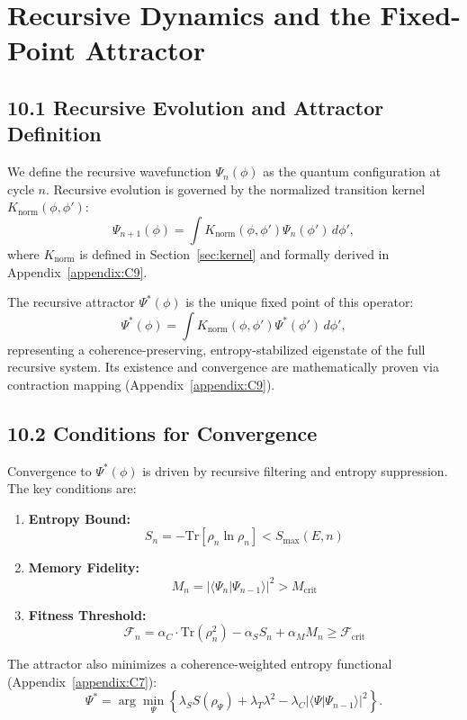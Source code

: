 \section{Recursive Dynamics and the Fixed-Point Attractor}
\label{sec:attractor}

\subsection{10.1 Recursive Evolution and Attractor Definition}

We define the recursive wavefunction \( \Psi_n(\phi) \) as the quantum configuration at cycle \( n \). Recursive evolution is governed by the normalized transition kernel \( K_{\text{norm}}(\phi, \phi') \):
\[
\Psi_{n+1}(\phi) = \int K_{\text{norm}}(\phi, \phi') \Psi_n(\phi') \, d\phi',
\]
where \( K_{\text{norm}} \) is defined in Section~\ref{sec:kernel} and formally derived in Appendix~\ref{appendix:C9}.

The recursive attractor \( \Psi^*(\phi) \) is the unique fixed point of this operator:
\[
\Psi^*(\phi) = \int K_{\text{norm}}(\phi, \phi') \Psi^*(\phi') \, d\phi',
\]
representing a coherence-preserving, entropy-stabilized eigenstate of the full recursive system. Its existence and convergence are mathematically proven via contraction mapping (Appendix~\ref{appendix:C9}).

\subsection{10.2 Conditions for Convergence}

Convergence to \( \Psi^*(\phi) \) is driven by recursive filtering and entropy suppression. The key conditions are:

\begin{enumerate}
    \item \textbf{Entropy Bound:}
    \[
    S_n = -\text{Tr}[\rho_n \ln \rho_n] < S_{\text{max}}(E, n)
    \]
    \item \textbf{Memory Fidelity:}
    \[
    M_n = |\langle \Psi_n | \Psi_{n-1} \rangle|^2 > M_{\text{crit}}
    \]
    \item \textbf{Fitness Threshold:}
    \[
    \mathcal{F}_n = \alpha_C \cdot \text{Tr}(\rho_n^2) - \alpha_S S_n + \alpha_M M_n \geq \mathcal{F}_{\text{crit}}
    \]
\end{enumerate}

The attractor also minimizes a coherence-weighted entropy functional (Appendix~\ref{appendix:C7}):
\[
\Psi^* = \arg\min_{\Psi} \left\{ \lambda_S S(\rho_\Psi) + \lambda_T \lambda^2 - \lambda_C |\langle \Psi | \Psi_{n-1} \rangle|^2 \right\}.
\]

